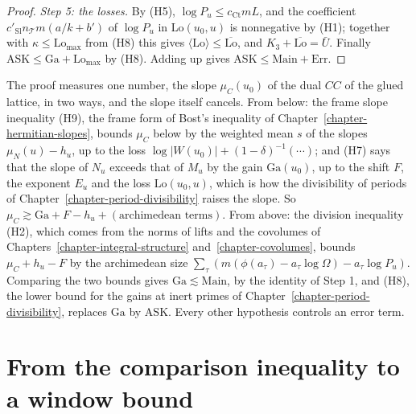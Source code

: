 \begin{proof}
\emph{Step 5: the losses.} By (H5), $\log P_u\leq c_{\mathrm{Ct}}mL$, and the
coefficient $c'_{\mathrm{Sl}}n_{\mathcal T}m(a/k+b')$ of $\log P_u$ in
$\mathrm{Lo}(u_0,u)$ is nonnegative by (H1); together with
$\kappa\leq\mathrm{Lo}_{\max}$ from (H8) this gives
$\langle\mathrm{Lo}\rangle\leq\overline{\mathrm{Lo}}$, and
$K_3+\overline{\mathrm{Lo}}=\bar U$. Finally
$\mathrm{ASK}\leq\mathrm{Ga}+\mathrm{Lo}_{\max}$ by (H8). Adding up gives
$\mathrm{ASK}\leq\mathrm{Main}+\mathrm{Err}$.
\end{proof}

\begin{remark}\label{ib-two-measurements}
The proof measures one number, the slope $\mu_C(u_0)$ of the dual $CC$ of the
glued lattice, in two ways, and the slope itself cancels. From below: the frame slope
inequality (H9), the frame form of Bost's inequality of
Chapter~\ref{chapter-hermitian-slopes}, bounds $\mu_C$ below by the weighted mean
$s$ of the slopes $\mu_N(u)-h_u$, up to the loss
$\log|W(u_0)|+(1-\delta)^{-1}(\cdots)$; and (H7) says that the slope of $N_u$
exceeds that of $M_u$ by the gain $\mathrm{Ga}(u_0)$, up to the shift $F$, the
exponent $E_u$ and the loss $\mathrm{Lo}(u_0,u)$, which is how the divisibility
of periods of Chapter~\ref{chapter-period-divisibility} raises the slope. So
$\mu_C\gtrsim\mathrm{Ga}+F-h_u+(\text{archimedean terms})$. From above: the
division inequality (H2), which comes from the norms of lifts and the covolumes
of Chapters~\ref{chapter-integral-structure} and~\ref{chapter-covolumes}, bounds
$\mu_C+h_u-F$ by the archimedean size
$\sum_\tau(m(\phi(a_\tau)-a_\tau\log\Omega)-a_\tau\log P_u)$. Comparing the two
bounds gives $\mathrm{Ga}\lesssim\mathrm{Main}$, by the identity of Step 1, and
(H8), the lower bound for the gains at inert primes of
Chapter~\ref{chapter-period-divisibility}, replaces $\mathrm{Ga}$ by
$\mathrm{ASK}$. Every other hypothesis controls an error term.
\end{remark}

\section{From the comparison inequality to a window bound}\label{section-ib-window}

